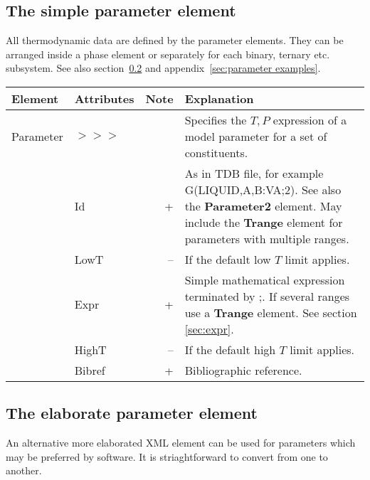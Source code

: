 \documentclass{article}
\begin{document}

\subsection{The simple parameter element}

All thermodynamic data are defined by the parameter elements.  They
can be arranged inside a phase element or separately for each binary,
ternary etc. subsystem.  See also section~\ref{sec:parameter2} and
  appendix~\ref{sec:parameter examples}.

\bigskip
\begin{tabular}{|p{} p{} r p{}|}\hline
  Element & Attributes & Note & Explanation\\\hline

  Parameter &$>>>$&& Specifies the $T, P$ expression of a model parameter for a set of constituents.\\
      & Id & + & As in TDB file, for example G(LIQUID,A,B:VA;2).  See also the {\bf Parameter2} element.  May include the {\bf Trange} element for parameters with multiple ranges.\\
      & LowT & -- & If the default low $T$ limit applies.\\
      & Expr & + & Simple mathematical expression terminated by ;.  If several ranges use a {\bf Trange} element.  See section \ref{sec:expr}.\\
      & HighT & -- & If the default high $T$ limit applies.\\
      & Bibref & + & Bibliographic reference.\\\hline
\end{tabular}

\subsection{The elaborate parameter element}\label{sec:parameter2}

An alternative more elaborated XML element can be used for parameters
which may be preferred by software.  It is striaghtforward to convert
from one to another.
\end{document}

